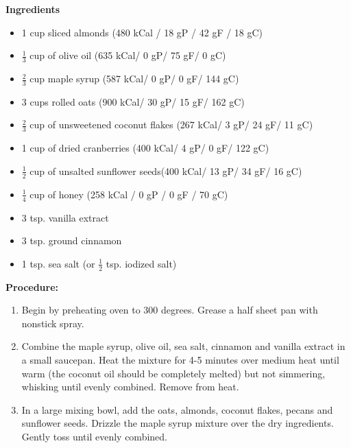 \documentclass{report}
\begin{document}


\bigskip

\bigskip

\begin{multicols}{2}
\textbf{Ingredients}
\begin{itemize}
\item 1 cup sliced almonds \newline (480 kCal / 18 gP / 42 gF / 18 gC)
\item $\frac{1}{3}$ cup of olive oil \quad (635 kCal/ 0 gP/ 75 gF/ 0 gC)
\item $\frac{2}{3}$ cup maple syrup \quad (587 kCal/ 0 gP/ 0 gF/ 144 gC)
\item 3 cups rolled oats \quad (900 kCal/ 30 gP/ 15 gF/ 162 gC)
\item $\frac{2}{3}$ cup of unsweetened coconut flakes \newline (267 kCal/ 3 gP/ 24 gF/ 11 gC)
\item 1 cup of dried cranberries \newline (400 kCal/ 4 gP/ 0 gF/ 122 gC)
\item $\frac{1}{2}$ cup of unsalted sunflower seeds\newline (400 kCal/ 13 gP/ 34 gF/ 16 gC)
\item $\frac{1}{4}$ cup of honey \quad (258 kCal / 0 gP / 0 gF / 70 gC) 
\item 3 tsp. vanilla extract
\item 3 tsp. ground cinnamon
\item 1 tsp. sea salt (or $\frac{1}{2}$ tsp. iodized salt)



\end{itemize}


\columnbreak
\textbf{Procedure:}
\medskip


\begin{enumerate}
\item Begin by preheating oven to 300 degrees. Grease a half sheet pan with nonstick spray. 

\item Combine the maple syrup, olive oil, sea salt, cinnamon and vanilla extract in a small saucepan. Heat the mixture for 4-5 minutes over medium heat until warm (the coconut oil should be completely melted) but not simmering, whisking until evenly combined. Remove from heat. 

\item In a large mixing bowl, add the oats, almonds, coconut flakes, pecans and sunflower seeds. Drizzle the maple syrup mixture over the dry ingredients. Gently toss until evenly combined.


\end{enumerate}
\end{multicols}
\end{document}
